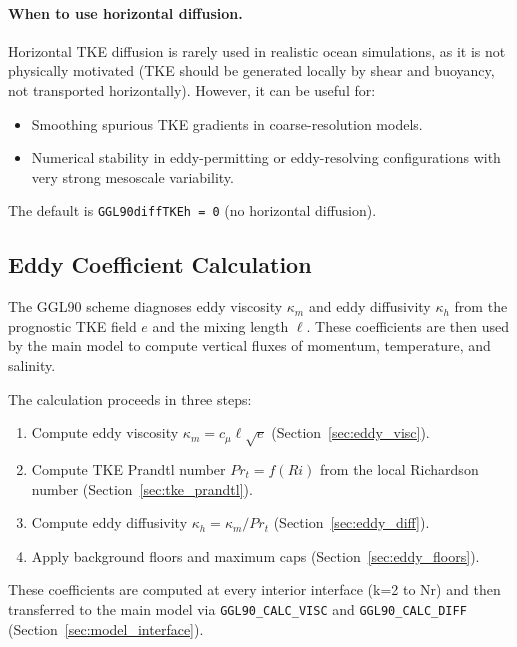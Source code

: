 \documentclass[12pt,letterpaper]{article}
\begin{document}
\paragraph{When to use horizontal diffusion.} Horizontal TKE diffusion is rarely used in realistic ocean simulations, as it is not physically motivated (TKE should be generated locally by shear and buoyancy, not transported horizontally). However, it can be useful for:
\begin{itemize}
\item Smoothing spurious TKE gradients in coarse-resolution models.
\item Numerical stability in eddy-permitting or eddy-resolving configurations with very strong mesoscale variability.
\end{itemize}

The default is \verb|GGL90diffTKEh = 0| (no horizontal diffusion).

\subsection{Eddy Coefficient Calculation}
\label{sec:eddy_coeffs}

The GGL90 scheme diagnoses eddy viscosity $\kappa_m$ and eddy diffusivity $\kappa_h$ from the prognostic TKE field $e$ and the mixing length $\ell$. These coefficients are then used by the main model to compute vertical fluxes of momentum, temperature, and salinity.

The calculation proceeds in three steps:
\begin{enumerate}
\item Compute eddy viscosity $\kappa_m = c_\mu \ell \sqrt{e}$ (Section~\ref{sec:eddy_visc}).
\item Compute TKE Prandtl number $Pr_t = f(Ri)$ from the local Richardson number (Section~\ref{sec:tke_prandtl}).
\item Compute eddy diffusivity $\kappa_h = \kappa_m / Pr_t$ (Section~\ref{sec:eddy_diff}).
\item Apply background floors and maximum caps (Section~\ref{sec:eddy_floors}).
\end{enumerate}

These coefficients are computed at every interior interface (k=2 to Nr) and then transferred to the main model via \verb|GGL90_CALC_VISC| and \verb|GGL90_CALC_DIFF| (Section~\ref{sec:model_interface}).
\end{document}
